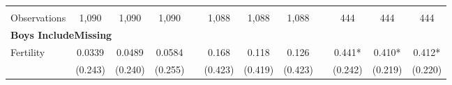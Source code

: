 \begin{landscape}
\begin{table}[htpb!]
\begin{center}
\begin{tabular}{lcccp{2mm}cccp{2mm}ccc}
\begin{footnotesize}\end{footnotesize}&\begin{footnotesize}\end{footnotesize}&\begin{footnotesize}\end{footnotesize}&\begin{footnotesize}\end{footnotesize}&\begin{footnotesize}\end{footnotesize}&\begin{footnotesize}\end{footnotesize}&\begin{footnotesize}\end{footnotesize}&\begin{footnotesize}\end{footnotesize}&\begin{footnotesize}\end{footnotesize}&\begin{footnotesize}\end{footnotesize}&\begin{footnotesize}\end{footnotesize}&\begin{footnotesize}\end{footnotesize}\\Observations&1,090&1,090&1,090&&1,088&1,088&1,088&&444&444&444\\
\multicolumn{12}{l}{\textbf{Boys IncludeMissing}}\\ 
Fertility&0.0339&0.0489&0.0584&&0.168&0.118&0.126&&0.441*&0.410*&0.412*\\
&(0.243)&(0.240)&(0.255)&&(0.423)&(0.419)&(0.423)&&(0.242)&(0.219)&(0.220)\\

\end{tabular}
\end{center}
\end{table}
\end{landscape}
